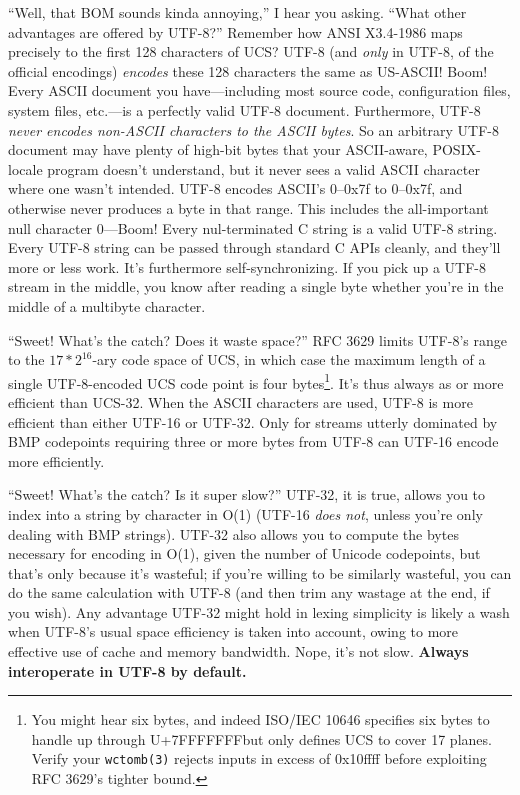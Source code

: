 ``Well, that BOM sounds kinda annoying,'' I hear you asking. ``What other
advantages are offered by UTF-8?'' Remember how ANSI X3.4-1986 maps precisely
to the first 128 characters of UCS? UTF-8 (and \textit{only} in UTF-8, of
the official encodings) \textit{encodes} these 128 characters the same as
US-ASCII! Boom! Every ASCII document you have---including most source code,
configuration files, system files, etc.---is a perfectly valid UTF-8 document.
Furthermore, UTF-8 \textit{never encodes non-ASCII characters to the ASCII
bytes}. So an arbitrary UTF-8 document may have plenty of high-bit bytes that
your ASCII-aware, POSIX-locale program doesn't understand, but it never sees
a valid ASCII character where one wasn't intended. UTF-8 encodes ASCII's 0--0x7f
to 0--0x7f, and otherwise never produces a byte in that range. This includes
the all-important null character 0---Boom! Every nul-terminated C string is a
valid UTF-8 string. Every UTF-8 string can be passed through standard C APIs
cleanly, and they'll more or less work. It's furthermore self-synchronizing.
If you pick up a UTF-8 stream in the middle, you know after reading a single
byte whether you're in the middle of a multibyte character.

``Sweet! What's the catch? Does it waste space?'' RFC 3629\cite{rfc3629}
limits UTF-8's range to the $17*2^{16}$-ary code space of UCS, in which case
the maximum length of a single UTF-8-encoded UCS code point is four bytes\footnote{You
might hear six bytes, and indeed ISO/IEC 10646 specifies six bytes to handle
up through U+7FFFFFFF\textellipsis but only defines UCS to cover 17 planes.
Verify your \texttt{wctomb(3)} rejects inputs in excess of 0x10ffff before
exploiting RFC 3629's tighter bound.}. It's thus always as or more efficient
than UCS-32. When the ASCII characters are used, UTF-8 is more efficient than
either UTF-16 or UTF-32. Only for streams utterly dominated by BMP codepoints
requiring three or more bytes from UTF-8 can UTF-16 encode more efficiently.

``Sweet! What's the catch? Is it super slow?'' UTF-32, it is true, allows you
to index into a string by character in O(1) (UTF-16 \textit{does not}, unless
you're only dealing with BMP strings). UTF-32 also allows you to compute the
bytes necessary for encoding in O(1), given the number of Unicode codepoints,
but that's only because it's wasteful; if you're willing to be similarly
wasteful, you can do the same calculation with UTF-8 (and then trim any wastage
at the end, if you wish). Any advantage UTF-32 might hold in lexing simplicity
is likely a wash when UTF-8's usual space efficiency is taken into account,
owing to more effective use of cache and memory bandwidth. Nope, it's not slow.
\textbf{Always interoperate in UTF-8 by default.}

